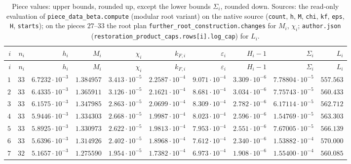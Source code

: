 {\scriptsize\setlength{\tabcolsep}{3pt}\renewcommand{\arraystretch}{0.92}
\begin{longtable}{@{}rrrrrrrrrr@{}}
\caption{Piece values: upper bounds, rounded up, except the lower bounds $\Sigma_i$, rounded down. Sources: the read-only evaluation of \texttt{piece\_data\_beta.compute} (modular root variant) on the native source (\texttt{count}, \texttt{h}, \texttt{M}, \texttt{chi}, \texttt{kf}, \texttt{eps}, \texttt{H}, \texttt{starts}); on the pieces $27$--$33$ the root plan \texttt{further\_root\_construction.changes} for $M_i$, $\chi_i$; \texttt{author.json} (\texttt{restoration\_product\_caps.rows[i].log\_cap}) for $L_i$.}\label{tab:data:piece-values}\\
\toprule
$i$ & $n_i$ & $h_i$ & $M_i$ & $\chi_i$ & $k_{F,i}$ & $\varepsilon_i$ & $H_i-1$ & $\Sigma_i$ & $L_i$\\
\midrule
\endfirsthead
\toprule
$i$ & $n_i$ & $h_i$ & $M_i$ & $\chi_i$ & $k_{F,i}$ & $\varepsilon_i$ & $H_i-1$ & $\Sigma_i$ & $L_i$\\
\midrule
\endhead
\bottomrule
\endfoot
$1$ & $33$ & $6.7232\cdot10^{-3}$ & $1.384957$ & $3.413\cdot10^{-5}$ & $2.2587\cdot10^{-4}$ & $9.071\cdot10^{-4}$ & $3.309\cdot10^{-6}$ & $7.78804\cdot10^{-5}$ & $557.563$\\
$2$ & $33$ & $6.4335\cdot10^{-3}$ & $1.365911$ & $3.126\cdot10^{-5}$ & $2.1621\cdot10^{-4}$ & $8.681\cdot10^{-4}$ & $3.034\cdot10^{-6}$ & $7.75743\cdot10^{-5}$ & $560.433$\\
$3$ & $33$ & $6.1575\cdot10^{-3}$ & $1.347985$ & $2.863\cdot10^{-5}$ & $2.0699\cdot10^{-4}$ & $8.309\cdot10^{-4}$ & $2.782\cdot10^{-6}$ & $6.17114\cdot10^{-5}$ & $562.712$\\
$4$ & $33$ & $5.9446\cdot10^{-3}$ & $1.334303$ & $2.668\cdot10^{-5}$ & $1.9987\cdot10^{-4}$ & $8.023\cdot10^{-4}$ & $2.596\cdot10^{-6}$ & $1.54769\cdot10^{-5}$ & $563.303$\\
$5$ & $33$ & $5.8925\cdot10^{-3}$ & $1.330973$ & $2.622\cdot10^{-5}$ & $1.9813\cdot10^{-4}$ & $7.953\cdot10^{-4}$ & $2.551\cdot10^{-6}$ & $7.67005\cdot10^{-5}$ & $566.139$\\
$6$ & $33$ & $5.6396\cdot10^{-3}$ & $1.314926$ & $2.402\cdot10^{-5}$ & $1.8968\cdot10^{-4}$ & $7.612\cdot10^{-4}$ & $2.340\cdot10^{-6}$ & $1.53882\cdot10^{-4}$ & $570.000$\\
$7$ & $32$ & $5.1657\cdot10^{-3}$ & $1.275590$ & $1.954\cdot10^{-5}$ & $1.7382\cdot10^{-4}$ & $6.973\cdot10^{-4}$ & $1.908\cdot10^{-6}$ & $1.55400\cdot10^{-4}$ & $560.085$\\

\end{longtable}}
